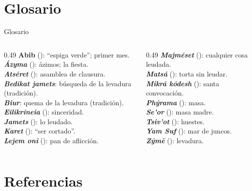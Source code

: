 \section{Glosario}

\begin{frame}{Glosario}
\scriptsize
\begin{columns}[t,onlytextwidth]
\begin{column}{0.49\textwidth}
\textbf{Abib} (): ``espiga verde''; primer mes.\\
\textbf{\emph{Ázyma}} (): ázimos; la fiesta.\\
\textbf{\emph{Atséret}} (): asamblea de clausura.\\
\textbf{\emph{Bedikat jamets}}: búsqueda de la levadura (tradición).\\
\textbf{\emph{Biur}}: quema de la levadura (tradición).\\
\textbf{\emph{Eilikríneia}} (): sinceridad.\\
\textbf{\emph{Jamets}} (): lo leudado.\\
\textbf{\emph{Karet}} (): ``ser cortado''.\\
\textbf{\emph{Lejem oni}} (): pan de aflicción.
\end{column}
\begin{column}{0.49\textwidth}
\textbf{\emph{Majméset}} (): cualquier cosa leudada.\\
\textbf{\emph{Matsá}} (): torta sin leudar.\\
\textbf{\emph{Mikrá kódesh}} (): santa convocación.\\
\textbf{\emph{Phýrama}} (): masa.\\
\textbf{\emph{Se'or}} (): masa madre.\\
\textbf{\emph{Tsiv'ot}} (): huestes.\\
\textbf{\emph{Yam Suf}} (): mar de juncos.\\
\textbf{\emph{Zýmē}} (): levadura.
\end{column}
\end{columns}
\end{frame}

\section{Referencias}

